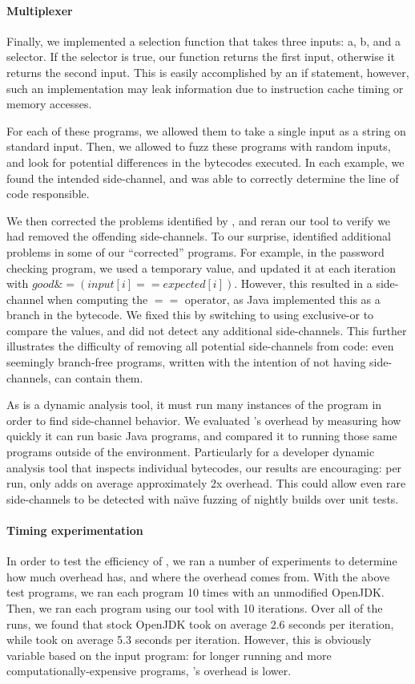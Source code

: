 \paragraph{Multiplexer}
Finally, we implemented a selection function that takes three inputs: a, b, and
a selector. If the selector is true, our function returns the first input,
otherwise it returns the second input. This is easily accomplished by an if
statement, however, such an implementation may leak information due to instruction cache timing or
memory accesses.

\bigskip

For each of these programs, we allowed them to take a single input as a string
on standard input. Then, we allowed \jcupid to fuzz these programs with random
inputs, and look for potential differences in the bytecodes executed. In each
example, we found the intended side-channel, and \jcupid was able to correctly
determine the line of code responsible.

We then corrected the problems identified by \jcupid, and reran our tool to
verify we had removed the offending side-channels. To our surprise, \jcupid
identified additional problems in some of our ``corrected'' programs. For example, in
the password checking program, we used a temporary value, and updated it at each
iteration with $ good \&= (input[i] == expected[i]) $. However, this resulted in
a side-channel when computing the $ == $ operator, as Java implemented this as a
branch in the bytecode. We fixed this by switching to using exclusive-or to
compare the values, and \jcupid did not detect any additional side-channels. This
further illustrates the difficulty of removing all potential side-channels from
code: even seemingly branch-free programs, written with the intention of not
having side-channels, can contain them.


As \jcupid is a dynamic analysis tool, it must run many instances of the program
in order to find side-channel behavior. We evaluated \jcupid's overhead by
measuring how quickly it can run basic Java programs, and compared it to
running those same programs outside of the \jcupid environment. Particularly for
a developer dynamic analysis tool that inspects individual bytecodes, our
results are encouraging: per run, \jcupid only adds on average approximately 2x
overhead. This could allow even rare side-channels to be detected with
na\"{\i}ve fuzzing of nightly builds over unit tests.

\paragraph{Timing experimentation}
In order to test the efficiency of \jcupid, we ran a number of experiments to
determine how much overhead \jcupid has, and where the overhead comes from.
With the above test programs, we ran each program 10 times with an unmodified
OpenJDK. Then, we ran each program using our tool with 10 iterations. Over all
of the runs, we found that stock OpenJDK took on average 2.6 seconds per
iteration, while \jcupid took on average 5.3 seconds per iteration. However, this
is obviously variable based on the input program: for longer running and more
computationally-expensive programs, \jcupid's overhead is lower.

